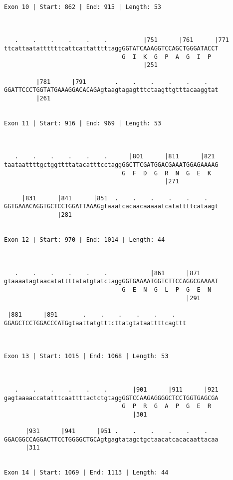\documentclass{article}
\begin{document}
\begin{Verbatim}
 
Exon 10 | Start: 862 | End: 915 | Length: 53



   .    .    .    .    .    .          |751      |761      |771
ttcattaatattttttcattcattatttttaggGGTATCAAAGGTCCAGCTGGGATACCT
                                 G  I  K  G  P  A  G  I  P  
                                       |251                 
  
         |781      |791        .    .    .    .    .    .   
GGATTCCCTGGTATGAAAGGACACAGAgtaagtagagtttctaagttgtttacaaggtat
         |261                                               
  
 
Exon 11 | Start: 916 | End: 969 | Length: 53



   .    .    .    .    .    .      |801      |811      |821 
taataattttgctggttttatacatttcctaggGGCTTCGATGGACGAAATGGAGAAAAG
                                 G  F  D  G  R  N  G  E  K  
                                             |271           
  
     |831      |841      |851  .    .    .    .    .    .   
GGTGAAACAGGTGCTCCTGGATTAAAGgtaaatcacaacaaaaatcatattttcataagt
               |281                                         
  
 
Exon 12 | Start: 970 | End: 1014 | Length: 44



   .    .    .    .    .    .            |861      |871     
gtaaaatagtaacatattttatatgtatctaggGGTGAAAATGGTCTTCCAGGCGAAAAT
                                 G  E  N  G  L  P  G  E  N  
                                                   |291     
  
 |881      |891       .    .    .    .    .    .   
GGAGCTCCTGGACCCATGgtaattatgtttcttatgtataattttcagttt
                                                   
  
 
Exon 13 | Start: 1015 | End: 1068 | Length: 53



   .    .    .    .    .    .       |901      |911      |921
gagtaaaaccatatttcaattttactctgtaggGGTCCAAGAGGGGCTCCTGGTGAGCGA
                                 G  P  R  G  A  P  G  E  R  
                                    |301                    
  
      |931      |941      |951 .    .    .    .    .    .   
GGACGGCCAGGACTTCCTGGGGCTGCAgtgagtatagctgctaacatcacacaattacaa
      |311                                                  
  
 
Exon 14 | Start: 1069 | End: 1113 | Length: 44




\end{Verbatim}
\end{document}
